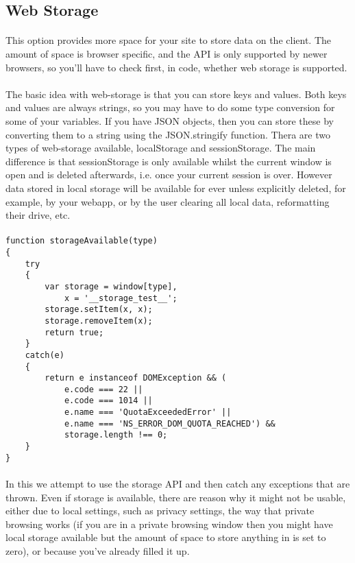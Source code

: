 \documentclass[10pt, a4paper, twosize]{article}
\begin{document}
\subsection*{Web Storage}

\paragraph{} This option provides more space for your site to store data on the client. The amount of space is browser specific, and the API is only supported by newer browsers, so you'll have to check first, in code, whether web storage is supported.

\paragraph{} The basic idea with web-storage is that you can store keys and values. Both keys and values are always strings, so you may have to do some type conversion for some of your variables. If you have JSON objects, then you can store these by converting them to a string using the JSON.stringify function. Thera are two types of web-storage available, localStorage and sessionStorage. The main difference is that sessionStorage is only available whilst the current window is open and is deleted afterwards, i.e. once your current session is over. However data stored in local storage will be available for ever unless explicitly deleted, for example, by your webapp, or by the user clearing all local data, reformatting their drive, etc.

\paragraph{} 

\begin{lstlisting}
function storageAvailable(type)
{
    try
    {
        var storage = window[type],
            x = '__storage_test__';
        storage.setItem(x, x);
        storage.removeItem(x);
        return true;
    }
    catch(e)
    {
        return e instanceof DOMException && (
            e.code === 22 ||
            e.code === 1014 ||
            e.name === 'QuotaExceededError' ||
            e.name === 'NS_ERROR_DOM_QUOTA_REACHED') &&
            storage.length !== 0;
    }
}
\end{lstlisting}
\paragraph{} In this we attempt to use the storage API and then catch any exceptions that are thrown. Even if storage is available, there are reason why it might not be usable, either due to local settings, such as privacy settings, the way that private browsing works (if you are in a private browsing window then you might have local storage available but the amount of space to store anything in is set to zero), or because you've already filled it up.
\end{document}
